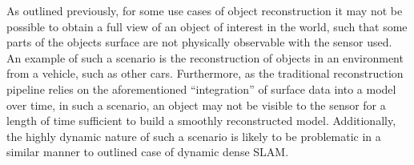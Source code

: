 As outlined previously, for some use cases of object reconstruction it may not be possible to obtain a 
full view of an object of interest in the world, such that some parts of the objects surface are not 
physically observable with the sensor used. An example of such a scenario is the reconstruction of 
objects in an environment from a vehicle, such as other cars. Furthermore, as the traditional reconstruction 
pipeline relies on the aforementioned ``integration'' of surface data into a model over time, in such a 
scenario, an object may not be visible to the sensor for a length of time sufficient to build a smoothly 
reconstructed model. Additionally, the highly dynamic nature of such a scenario is likely to be problematic 
in a similar manner to outlined case of dynamic dense SLAM.


